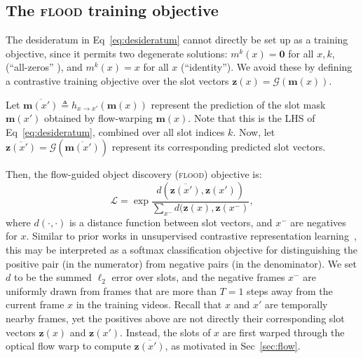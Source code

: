 \documentclass{article}
\newcommand{\jd}[1]{\textcolor{orange}{[DJ: #1]}}
\begin{document}

\subsection{The \textsc{flood} training objective}\label{sec:flood}

The desideratum in Eq~\eqref{eq:desideratum} cannot directly be set up as a training objective, since it permits two degenerate solutions: $m^k(x)=\bm{0}$ for all $x, k$, (``all-zeros'' ), and  $m^k(x)=x$ for all $x$ (``identity''). We avoid these by defining a contrastive training objective over the slot vectors $\bm{z}(x) = \mathcal{G}(\bm{m}(x))$. 


Let $\overline{\bm{m}(x')} \triangleq h_{x \rightarrow x'}(\bm{m}(x))$ represent the prediction of the slot mask $\bm{m}(x')$ obtained by flow-warping $\bm{m}(x)$. Note that this is the LHS of Eq~\eqref{eq:desideratum}, combined over all slot indices $k$.  Now, let $\overline{\bm{z}(x')}=\mathcal{G}(\overline{\bm{m}(x')})$ represent its corresponding predicted slot vectors. 

Then, the flow-guided object discovery (\textsc{flood}) objective is:
\begin{equation}
\mathcal{L} = \exp \dfrac {d(\overline{\bm{z}(x')}, \bm{z}(x'))}{\sum_{x^-} d(\bm{z}(x), \bm{z}(x^-)}, \label{eq:flood_loss}
\end{equation}
where $d(\cdot, \cdot)$ is a distance function between slot vectors, and $x^-$ are negatives for $x$. Similar to prior works in unsupervised contrastive representation learning~\cite{oord2018representation,chen2020simple}, this may be interpreted as a softmax classification objective for distinguishing the positive pair (in the numerator) from negative pairs (in the denominator). We set $d$ to be the summed $\ell_2$ error over slots, and the negative frames $x^-$ are uniformly drawn from frames that are more than $T=1$ steps away from the current frame $x$ in the training videos. 
Recall that $x$ and $x'$ are temporally nearby frames, yet the positives above are not directly their corresponding slot vectors $\bm{z}(x)$ and $\bm{z}(x')$. Instead, the slots of $x$ are first warped through the optical flow warp to compute $\overline{\bm{z}(x')}$, as motivated in Sec~\ref{sec:flow}.
\end{document}

